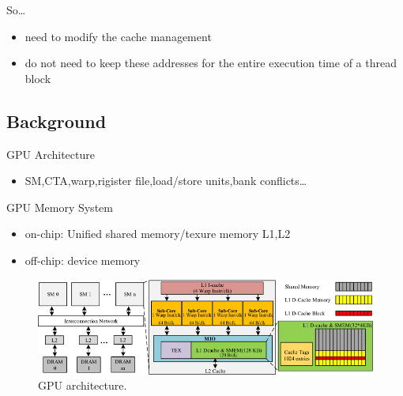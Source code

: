 \documentclass[
    fontset=fandol,
    xcolor=svgnames %
]{ctexbeamer}
\begin{document}
\begin{frame}
    \begin{block}{So\dots}
        \begin{itemize}
            \item need to modify the cache management
            \item do not need to keep these addresses for the entire execution time of a thread block
        \end{itemize}
    \end{block}
\end{frame}

\subsection{Background}

\begin{frame}

    \begin{block}{GPU Architecture}
        \begin{itemize}
            \item SM,CTA,warp,rigister file,load/store units,bank conflicts\dots
        \end{itemize}
    \end{block}

    \begin{block}{GPU Memory System}
        \begin{itemize}
            \item on-chip: Unified shared memory/texure memory L1,L2
            \item off-chip: device memory
        \end{itemize}
    \end{block}

    \begin{figure}
        \includegraphics[width=1\textwidth]{assets/figure/sadro4-3154315-large.png}
        \caption{GPU architecture.}
    \end{figure}

\end{frame}
\end{document}
